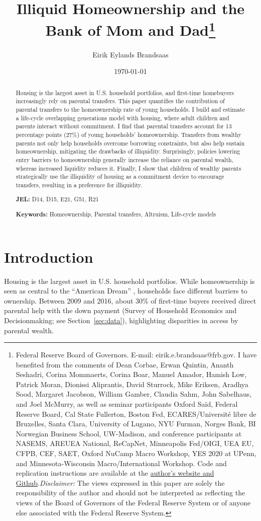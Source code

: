 \documentclass[12pt]{article}
\title{{\LARGE Illiquid Homeownership and the \\ Bank of Mom and Dad}\thanks{Federal Reserve Board of Governors. E-mail: eirik.e.brandsaas@frb.gov. I have benefited from the comments of Dean Corbae, Erwan Quintin, Ananth Seshadri, Corina Mommaerts, Corina Boar, Manuel Amador, Hamish Low, Patrick Moran, Dionissi Aliprantis, David Sturrock, Mike Eriksen, Aradhya Sood, Margaret Jacobson, William Gamber, Claudia Sahm, John Sabelhaus, and Joel McMurry, as well as seminar participants Oxford Sa{\"i}d, Federal Reserve Board, Cal State Fullerton, Boston Fed, ECARES/Université libre de Bruxelles, Santa Clara, University of Lugano, NYU Furman, Norges Bank, BI Norwegian Business School, UW-Madison, and conference participants at NASEMS, AREUEA National, ReCapNet, Minneapolis Fed/OIGI, UEA EU, CFPB, CEF, SAET, Oxford NuCamp Macro Workshop, YES 2020 at UPenn, and Minnesota-Wisconsin Macro/International Workshop. Code and replication instructions are available at the \href{https://github.com/eirikbrandsaas/HomeownershipBankMomDad.jl}{author's  website and Github}.\newline \textit{Disclaimer: }The views expressed in this paper are solely the responsibility of the author and should not be interpreted as reflecting the views of the Board of Governors of the Federal Reserve System or of anyone else associated with the Federal Reserve System.}}
\author{Eirik Eylands Brandsaas}
\date{{\today }}
\begin{document}
\maketitle
\begin{abstract}
{\begin{spacing}{1.2}
Housing is the largest asset in U.S. household portfolios, and first-time homebuyers increasingly rely on parental transfers. This paper quantifies the contribution of parental transfers to the homeownership rate of young households. I build and estimate a life-cycle overlapping generations model with housing, where adult children and parents interact without commitment. I find that parental transfers account for 13 percentage points (27\%) of young households' homeownership. Transfers from wealthy parents not only help households overcome borrowing constraints, but also help sustain homeownership, mitigating the drawbacks of illiquidity. Surprisingly, policies lowering entry barriers to homeownership generally increase the reliance on parental wealth, whereas increased liquidity reduces it. Finally, I show that children of wealthy parents strategically use the illiquidity of housing as a commitment device to encourage transfers, resulting in a preference for illiquidity.
\end{spacing}}
\vspace{0.5cm}
\noindent \textbf{JEL:} D14, D15, E21, G51, R21

\noindent \textbf{Keywords:} Homeownership, Parental transfers, Altruism, Life-cycle models

\end{abstract}
\newpage
\onehalfspacing

\section{Introduction}
Housing is the largest asset in U.S. household portfolios. While homeownership is seen as central to the ``American Dream'' \citep{goodman2018homeownership}, households face different barriers to ownership. Between 2009 and 2016, about 30\% of first-time buyers received direct parental help with the down payment (Survey of Household Economics and Decisionmaking; see Section~\ref{sec:data}), highlighting disparities in access by parental wealth.
\end{document}
